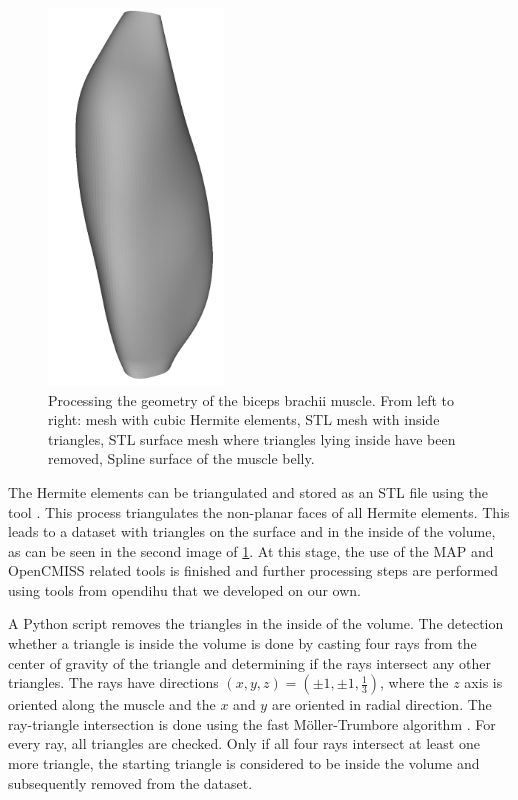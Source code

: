 \begin{figure}
  \includegraphics[height=10cm,trim=-2cm 0 0 -2cm, clip]{images/fiber_creation/splines00.png}%
  \caption{Processing the geometry of the biceps brachii muscle. From left to right: mesh with cubic Hermite elements, STL mesh with inside triangles, STL surface mesh where triangles lying inside have been removed, Spline surface of the muscle belly.}%
  \label{fig:biceps_processing}%
\end{figure}%

The Hermite elements can be triangulated and stored as an STL file using the tool . This process triangulates the non-planar faces of all Hermite elements. This leads to a dataset with triangles on the surface and in the inside of the volume, as can be seen in the second image of \cref{fig:biceps_processing}. At this stage, the use of the MAP and OpenCMISS related tools is finished and further processing steps are performed using tools from opendihu that we developed on our own.

A Python script removes the triangles in the inside of the volume. The detection whether a triangle is inside the volume is done by casting four rays from the center of gravity of the triangle and determining if the rays intersect any other triangles. The rays have directions $(x,y,z) = (\pm1,\pm1,\frac13)$, where the $z$ axis is oriented along the muscle and the $x$ and $y$ are oriented in radial direction. The ray-triangle intersection is done using the fast Möller-Trumbore algorithm \cite{ray-triangle}. For every ray, all triangles are checked.
Only if all four rays intersect at least one more triangle, the starting triangle is considered to be inside the volume and subsequently removed from the dataset. 

